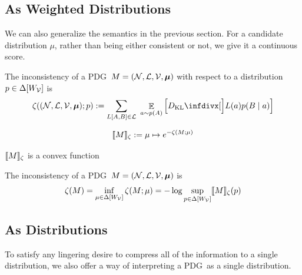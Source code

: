 \documentclass{article}
\newcommand\changeon{\color{note-fg} }
\newcommand\changeoff{\color{black} }
\newcommand{\MN}{PDG}%
\newcommand\bmu{\boldsymbol{\mu}}
\begin{document}
	\subsection{As Weighted Distributions}
	\changeon
	We can also generalize the semantics in the previous section. For a candidate distribution $\mu$, rather than being either consistent or not, we give it a continuous score.

	\begin{defn}
		The inconsistency of a \MN\ $M = (\cal N, L, V, \bmu)$ with respect to a distribution $p \in \Delta[W_{\cal V}]$ is
		\[
			\zeta(({\cal N, L, V}, \bmu) ; p) := %
			\sum_{L[A, B]\in \cal L}~\mathop{\mathbb E}_{a \sim p(A)} \left[\kldiv[\Big]{L(a) }{ p(B \mid a) } \right]
		\]
	\end{defn}	
	
	
	
	\begin{defn}
		\[\llbracket M\rrbracket_\zeta := \mu \mapsto e^{-\zeta(M;\mu)}\]
	\end{defn}



	\begin{conj}
		$\llbracket M\rrbracket_\zeta$ is a convex function
	\end{conj}

	\begin{defn}
		The inconsistency of a \MN\ $M = (\cal N, L, V, \bmu)$ is 
		\[ \zeta(M) = \inf_{ \mu \in \Delta [W_{\cal V}]} \zeta (M; \mu) = -\log \sup_{p \in \Delta[W_{\cal V}]} \llbracket M\rrbracket_\zeta (p) \]
	\end{defn}

	\changeoff
	

	
	\subsection{As Distributions}
	
	
	To satisfy any lingering desire to compress all of the information to a single distribution, we also offer a way of interpreting a \MN\ as a single distribution.
	
\end{document}
